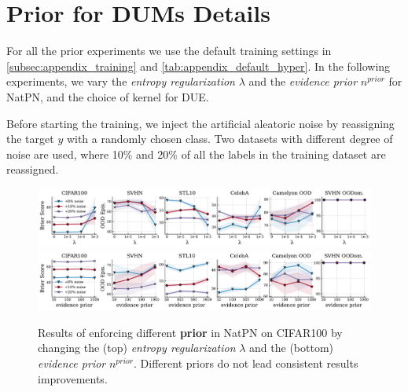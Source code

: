 \section{Prior for DUMs Details}
\label{subsec:appendix_prior}

For all the prior experiments we use the default training settings in \cref{subsec:appendix_training} and \cref{tab:appendix_default_hyper}. In the following experiments, we vary the \textit{entropy regularization} $\lambda$ and the \textit{evidence prior} $n^{prior}$ for NatPN, and the choice of kernel for DUE. 

Before starting the training, we inject the artificial aleatoric noise by reassigning the target $y$ with a randomly chosen class. Two datasets with different degree of noise are used, where 10\% and 20\% of all the labels in the training dataset are reassigned.  

\begin{figure}[!htb]
    \centering
    \includegraphics[width=\textwidth]{sections/008_iclr2023/figures/prior_entropy_brier_epis.pdf}
    \includegraphics[width=\textwidth]{sections/008_iclr2023/figures/prior_pseudo_brier_epis.pdf}
    
    \caption{Results of enforcing different \textbf{prior} in NatPN on CIFAR100 by changing the (top) \textit{entropy regularization} $\lambda$ and the (bottom) \textit{evidence prior} $n^{prior}$. Different priors do not lead consistent results improvements.}
    \label{fig:prior_ood_brier}
\end{figure}